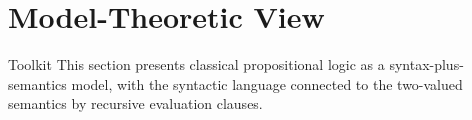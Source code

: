 \section{Model-Theoretic View}

\begin{toolkitbox}{Toolkit}
This section presents classical propositional logic as a syntax-plus-semantics
model, with the syntactic language connected to the two-valued semantics by
recursive evaluation clauses.
\end{toolkitbox}


